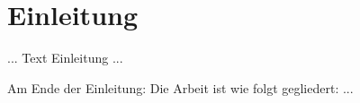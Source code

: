 \chapter{Einleitung}
\label{cha:Einleitung}

... Text Einleitung ...

Am Ende der Einleitung: Die Arbeit ist wie folgt gegliedert: ... 